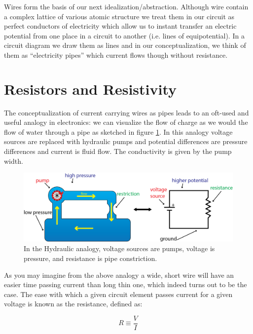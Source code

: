 \documentclass{tufte-book}
\begin{document}
Wires form the basis of our next idealization/abstraction. Although wire contain a complex lattice of various atomic structure we treat them in our circuit as perfect conductors of electricity which allow us to instant transfer an electric potential from one place in a circuit to another (i.e. lines of equipotential). In a circuit diagram we draw them as lines and in our conceptualization, we think of them as ``electricity pipes'' which current flows though without resistance. 


\section{Resistors and Resistivity}

The conceptualization of current carrying wires as pipes leads to an oft-used and useful analogy in electronics: we can visualize the flow of charge as we would the flow of water through a pipe as sketched in figure \ref{fig:water_analogy}. In this analogy voltage sources are replaced with hydraulic pumps and potential differences are pressure differences and current is fluid flow. The conductivity is given by the pump width. 

\begin{figure}[h]
\caption{In the Hydraulic analogy, voltage sources are pumps, voltage is pressure, and resistance is pipe constriction.}
\label{fig:water_analogy}
\begin{center}
\includegraphics[width=\textwidth]{waterpumpanalogy.png}
\end{center}
\end{figure}

As you may imagine from the above analogy a wide, short wire will have an easier time passing current than  long thin one, which indeed turns out to be the case. The ease with which a given circuit element passes current for a given voltage is known as the resistance, defined as:

\begin{equation}\label{eq:def_res_op}
R \equiv \frac{V}{I}
\end{equation}
\end{document}
